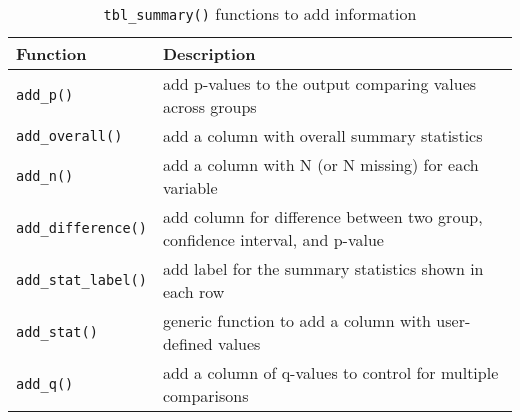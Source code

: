 \captionsetup[table]{labelformat=empty,skip=1pt}
\begin{longtable}{ll}
\caption{\label{tab:}\texttt{tbl\_summary()} functions to add information}\\
\toprule
Function & Description \\ 
\midrule
\texttt{add\_p()} & add p-values to the output comparing values across groups \\ 
\texttt{add\_overall()} & add a column with overall summary statistics \\ 
\texttt{add\_n()} & add a column with N (or N missing) for each variable \\ 
\texttt{add\_difference()} & add column for difference between two group, confidence interval, and p-value \\ 
\texttt{add\_stat\_label()} & add label for the summary statistics shown in each row \\ 
\texttt{add\_stat()} & generic function to add a column with user-defined values \\ 
\texttt{add\_q()} & add a column of q-values to control for multiple comparisons \\ 
\bottomrule
\end{longtable}

